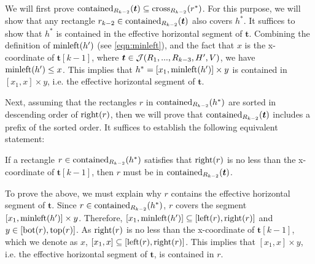 \vgap

We will first prove $\mathrm{contained}_{R_{k-2}}(\textrm{\boldmath${t}$})\subseteq \mathrm{cross}_{R_{k-2}}(r^*)$. For this purpose, we will show that any rectangle $r_{k-2} \in \mathrm{contained}_{R_{k-2}}(\textrm{\boldmath${t}$})$ also covers $h^*$. It suffices to show that $h^*$ is contained in the effective horizontal segment of $\bm{t}$. Combining the definition of $\mathrm{minleft}(h')$ (see \eqref{eqn:minleft}), and the fact that $x$ is the x-coordinate of $\bm{t}[k-1]$, where $\textrm{\boldmath${t}$} \in \mathcal{J}(R_1,...,R_{k-3},H',V)$, we have $\mathrm{minleft}(h') \le x$. This implies that $h^* = [x_1, \mathrm{minleft}(h')] \times y$ is contained in $[x_1, x] \times y$, i.e. the effective horizontal segment of $\bm{t}$. 

\vgap

Next, assuming that the rectangles $r$ in $\mathrm{contained}_{R_{k-2}}(h^*)$ are sorted in descending order of $\mathrm{right}(r)$, then we will prove that $\mathrm{contained}_{R_{k-2}}(\textrm{\boldmath${t}$})$ includes a prefix of the sorted order. It suffices to establish the following equivalent statement:

\vgap

 {
    If a rectangle $r \in \mathrm{contained}_{R_{k-2}}(h^*)$ satisfies that $\mathrm{right}(r)$ is no less than the x-coordinate of $\bm{t}[k-1]$, then $r$ must be in $\mathrm{contained}_{R_{k-2}}(\textrm{\boldmath${t}$})$.
}

\vgap

\noindent To prove the above, we must explain why $r$ contains the effective horizontal segment of $\bm{t}$. Since $r \in \mathrm{contained}_{R_{k-2}}(h^*)$, $r$ covers the segment $[x_1, \mathrm{minleft}(h')] \times y$. Therefore, $[x_1, \mathrm{minleft}(h')] \subseteq [\mathrm{left}(r), \mathrm{right}(r)]$ and $y \in [\mathrm{bot}(r), \mathrm{top}(r)]$.
As $\mathrm{right}(r)$ is no less than the x-coordinate of $\bm{t}[k-1]$, which we denote as $x$, $[x_1, x] \subseteq [\mathrm{left}(r), \mathrm{right}(r)]$. This implies that $[x_1, x] \times y$, i.e. the effective horizontal segment of $\bm{t}$, is contained in $r$. 

